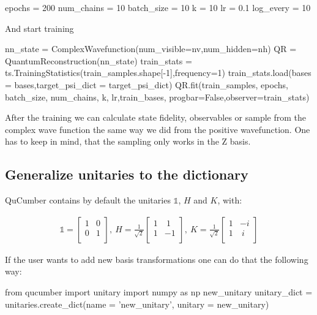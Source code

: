 \documentclass[submission, Phys]{SciPost}
\begin{document}
\begin{python}
epochs     = 200
num_chains = 10
batch_size = 10
k          = 10
lr         = 0.1
log_every  = 10
\end{python}

And start training

\begin{python}
nn_state = ComplexWavefunction(num_visible=nv,num_hidden=nh)
QR = QuantumReconstruction(nn_state)
train_stats = ts.TrainingStatistics(train_samples.shape[-1],frequency=1)
train_stats.load(bases = bases,target_psi_dict = target_psi_dict)
QR.fit(train_samples, epochs, batch_size, num_chains, k,
       lr,train_bases, progbar=False,observer=train_stats)
\end{python}

After the training we can calculate state fidelity, observables or sample from the complex wave function the same way we did from the positive wavefunction. One has to keep in mind, that the sampling only works in the Z basis.

\subsection{Generalize unitaries to the dictionary}

QuCumber contains by default the unitaries $\mathds{1}$, $H$ and $K$, with:

\begin{align}
\mathds{1} = 
\begin{bmatrix}
1 &0 \\
0 &1 \\ 
\end{bmatrix},~
H = \frac{1}{\sqrt{2}} 
\begin{bmatrix}
1 &~1 \\
1 &-1 \\ 
\end{bmatrix},~
K = \frac{1}{\sqrt{2}} 
\begin{bmatrix}
1 &-i \\
1 &~i \\ 
\end{bmatrix}
\end{align} 

If the user wants to add new basis transformations one can do that the following way:

\begin{python}
from qucumber import unitary
import numpy as np
new_unitary
unitary_dict = unitaries.create_dict(name = 'new_unitary', unitary = new_unitary)
\end{python}
\end{document}
